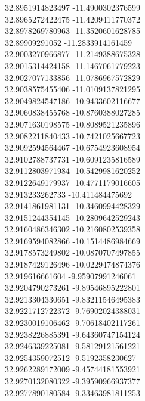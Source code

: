{32.8951914823497	-11.4900302376599\\
32.8965272422475	-11.4209411770372\\
32.8978269780963	-11.3520601628785\\
32.89909291052	-11.2833914161459\\
32.9003270966877	-11.2149388675328\\
32.9015314424158	-11.1467061779223\\
32.9027077133856	-11.0786967572829\\
32.9038575455406	-11.0109137821295\\
32.9049824547186	-10.9433602116677\\
32.9060838455768	-10.8760388027285\\
32.9071630198575	-10.8089521235896\\
32.9082211840433	-10.7421025667723\\
32.9092594564467	-10.6754923608954\\
32.9102788737731	-10.6091235816589\\
32.9112803971984	-10.5429981620252\\
32.9122649179937	-10.4771179016605\\
32.913233262733	-10.411484475692\\
32.9141861981131	-10.3460994428329\\
32.9151244354145	-10.2809642529243\\
32.9160486346302	-10.2160802539358\\
32.9169594082866	-10.1514486984669\\
32.9178573249802	-10.0870707497855\\
32.9187429126496	-10.0229474874376\\
32.919616661604	-9.95907991246061\\
32.9204790273261	-9.89546895222801\\
32.9213304330651	-9.83211546495383\\
32.9221712722372	-9.76902024388031\\
32.9230019106462	-9.70618402117261\\
32.9238226885391	-9.64360747154124\\
32.9246339225081	-9.58129121561221\\
32.9254359072512	-9.5192358230627\\
32.9262289172009	-9.45744181553921\\
32.9270132080322	-9.39590966937377\\
32.9277890180584	-9.33463981811253\\
}
